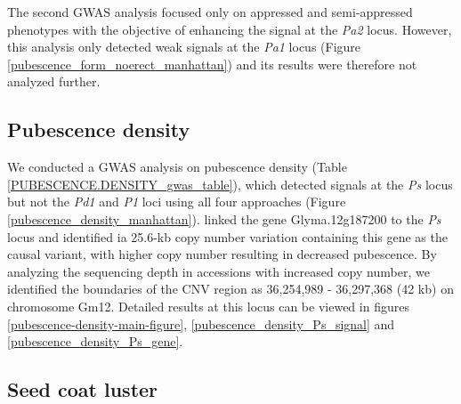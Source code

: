 The second GWAS analysis focused only on appressed and semi-appressed phenotypes
with the objective of enhancing the signal at the \emph{Pa2} locus. However,
this analysis only detected weak signals at the \emph{Pa1} locus (Figure
\ref{pubescence_form_noerect_manhattan}) and its results were therefore not
analyzed further.

\subsection*{Pubescence density}
\label{sv-gwas-pubescence-density}

We conducted a GWAS analysis on pubescence density (Table
\ref{PUBESCENCE.DENSITY_gwas_table}), which detected signals at the \emph{Ps}
locus but not the \emph{Pd1} and \emph{P1} loci using all four approaches
(Figure \ref{pubescence_density_manhattan}). \cite{liu2020ps} linked the gene
Glyma.12g187200 to the \emph{Ps} locus and identified ia 25.6-kb copy number variation
containing this gene as the causal variant, with
higher copy number resulting in decreased pubescence. By
analyzing the sequencing depth in accessions with increased copy number, we
identified the boundaries of the CNV region as 36,254,989 -
36,297,368 (42 kb) on chromosome Gm12.
Detailed results at this locus can be viewed in figures \ref{pubescence-density-main-figure},
\ref{pubescence_density_Ps_signal} and \ref{pubescence_density_Ps_gene}.

\subsection*{Seed coat luster}
\label{sv-gwas-seed-coat-luster}

